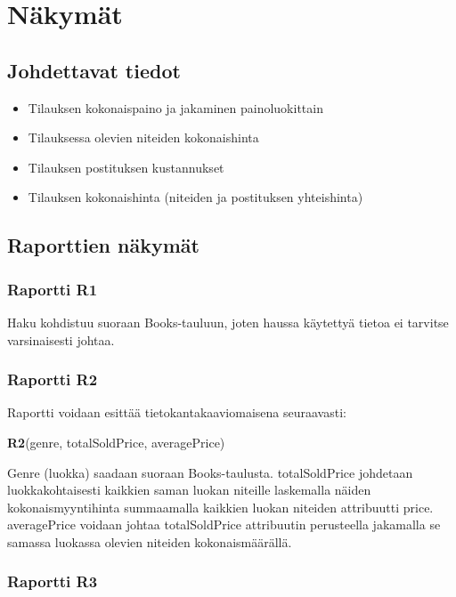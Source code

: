 \documentclass[11pt,a4paper]{article}
\begin{document}
\section{Näkymät}

\subsection{Johdettavat tiedot}

\begin{itemize}
	\item Tilauksen kokonaispaino ja jakaminen painoluokittain
	\item Tilauksessa olevien niteiden kokonaishinta
	\item Tilauksen postituksen kustannukset
	\item Tilauksen kokonaishinta (niteiden ja postituksen yhteishinta)
\end{itemize}

\subsection{Raporttien näkymät}

\subsubsection{Raportti R1}

Haku kohdistuu suoraan Books-tauluun, joten haussa käytettyä tietoa ei tarvitse varsinaisesti johtaa.

\subsubsection{Raportti R2}

Raportti voidaan esittää tietokantakaaviomaisena seuraavasti:

\textbf{R2}(genre, totalSoldPrice, averagePrice)

Genre (luokka) saadaan suoraan Books-taulusta. totalSoldPrice johdetaan luokkakohtaisesti kaikkien saman luokan niteille laskemalla näiden kokonaismyyntihinta summaamalla kaikkien luokan niteiden attribuutti price. averagePrice voidaan johtaa totalSoldPrice attribuutin perusteella jakamalla se samassa luokassa olevien niteiden kokonaismäärällä.

\subsubsection{Raportti R3}
\end{document}

